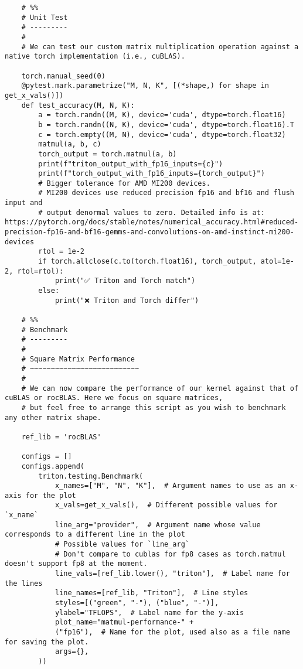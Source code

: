 \documentclass{article}
\begin{document}
\begin{lstlisting}
    # %%
    # Unit Test
    # ---------
    #
    # We can test our custom matrix multiplication operation against a native torch implementation (i.e., cuBLAS).

    torch.manual_seed(0)
    @pytest.mark.parametrize("M, N, K", [(*shape,) for shape in get_x_vals()])
    def test_accuracy(M, N, K):
        a = torch.randn((M, K), device='cuda', dtype=torch.float16)
        b = torch.randn((N, K), device='cuda', dtype=torch.float16).T
        c = torch.empty((M, N), device='cuda', dtype=torch.float32)
        matmul(a, b, c)
        torch_output = torch.matmul(a, b)
        print(f"triton_output_with_fp16_inputs={c}")
        print(f"torch_output_with_fp16_inputs={torch_output}")
        # Bigger tolerance for AMD MI200 devices.
        # MI200 devices use reduced precision fp16 and bf16 and flush input and
        # output denormal values to zero. Detailed info is at: https://pytorch.org/docs/stable/notes/numerical_accuracy.html#reduced-precision-fp16-and-bf16-gemms-and-convolutions-on-amd-instinct-mi200-devices
        rtol = 1e-2
        if torch.allclose(c.to(torch.float16), torch_output, atol=1e-2, rtol=rtol):
            print("✅ Triton and Torch match")
        else:
            print("❌ Triton and Torch differ")

    # %%
    # Benchmark
    # ---------
    #
    # Square Matrix Performance
    # ~~~~~~~~~~~~~~~~~~~~~~~~~~
    #
    # We can now compare the performance of our kernel against that of cuBLAS or rocBLAS. Here we focus on square matrices,
    # but feel free to arrange this script as you wish to benchmark any other matrix shape.

    ref_lib = 'rocBLAS'

    configs = []
    configs.append(
        triton.testing.Benchmark(
            x_names=["M", "N", "K"],  # Argument names to use as an x-axis for the plot
            x_vals=get_x_vals(),  # Different possible values for `x_name`
            line_arg="provider",  # Argument name whose value corresponds to a different line in the plot
            # Possible values for `line_arg`
            # Don't compare to cublas for fp8 cases as torch.matmul doesn't support fp8 at the moment.
            line_vals=[ref_lib.lower(), "triton"],  # Label name for the lines
            line_names=[ref_lib, "Triton"],  # Line styles
            styles=[("green", "-"), ("blue", "-")],
            ylabel="TFLOPS",  # Label name for the y-axis
            plot_name="matmul-performance-" +
            ("fp16"),  # Name for the plot, used also as a file name for saving the plot.
            args={},
        ))



\end{lstlisting}
\end{document}
